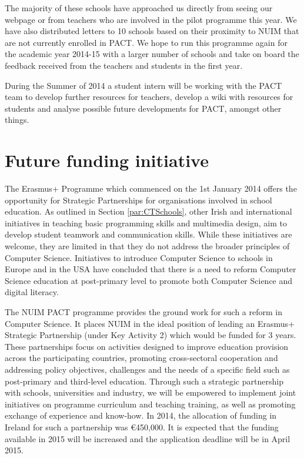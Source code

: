 \documentclass[a4paper]{article}
\begin{document}
The majority of these schools have approached us directly from seeing our webpage or from teachers who are involved in the pilot programme this year. We have also distributed letters to 10 schools based on their proximity to NUIM that are not currently enrolled in PACT. We hope to run this programme again for the academic year 2014-15 with a larger number of schools and take on board the feedback received from the teachers and students in the first year.

During the Summer of 2014 a student intern will be working with the PACT team to develop further resources for teachers, develop a wiki with resources for students and analyse possible future developments for PACT, amongst other things.


\section{Future funding initiative} \label{Sect:FutFunding}
The Erasmus+ Programme which commenced on the 1st January 2014 offers the opportunity for Strategic Partnerships for organisations involved in school education. As outlined in Section \ref{par:CTSchools}, other Irish and international initiatives in teaching basic programming skills and multimedia design, aim to develop student teamwork and communication skills. While these initiatives are welcome, they are limited in that they do not address the broader principles of Computer Science. Initiatives to introduce Computer Science to schools in Europe and in the USA have concluded that there is a need to reform Computer Science education at post-primary level to promote  both Computer Science and digital literacy. 

The NUIM PACT programme provides the ground work for such a reform in Computer Science. It places NUIM in the ideal position of leading an Erasmus+ Strategic Partnership (under Key Activity 2) which would be funded for 3 years. These partnerships focus on activities designed to improve education provision across the participating countries, promoting cross-sectoral cooperation and addressing policy objectives, challenges and the needs of a specific field such as post-primary and third-level education.  Through such a strategic partnership with schools, universities and industry, we will be empowered to implement joint initiatives on programme curriculum and teaching training, as well as promoting exchange of experience and know-how. In 2014, the allocation of funding in Ireland for such a partnership was \euro 450,000. It is expected that the funding available in 2015 will be increased and the application deadline will be in April 2015.  
\end{document}
